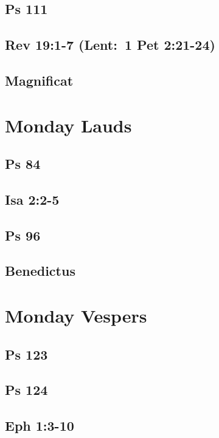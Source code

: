 \subsection{Ps 111}

\subsection{Rev 19:1-7 (Lent: 1 Pet 2:21-24)}

\subsection{Magnificat}


\section{Monday Lauds}

\subsection{Ps 84}

\subsection{Isa 2:2-5}

\subsection{Ps 96}

\subsection{Benedictus}


\section{Monday Vespers}

\subsection{Ps 123}

\subsection{Ps 124}

\subsection{Eph 1:3-10}

